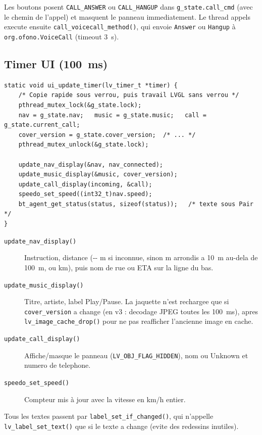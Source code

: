 \documentclass[a4paper,11pt]{article}
\begin{document}
Les boutons posent \texttt{CALL\_ANSWER} ou \texttt{CALL\_HANGUP} dans
\texttt{g\_state.call\_cmd} (avec le chemin de l'appel) et masquent le panneau
immediatement. Le thread appels execute ensuite \texttt{call\_voicecall\_method()},
qui envoie \texttt{Answer} ou
\texttt{Hangup} à \texttt{org.ofono.VoiceCall} (timeout 3~s).

\subsection{Timer UI (100~ms)}

\begin{lstlisting}[style=ccode,caption={main.c --- callback du timer LVGL (v4)}]
static void ui_update_timer(lv_timer_t *timer) {
    /* Copie rapide sous verrou, puis travail LVGL sans verrou */
    pthread_mutex_lock(&g_state.lock);
    nav = g_state.nav;   music = g_state.music;   call = g_state.current_call;
    cover_version = g_state.cover_version;  /* ... */
    pthread_mutex_unlock(&g_state.lock);

    update_nav_display(&nav, nav_connected);
    update_music_display(&music, cover_version);
    update_call_display(incoming, &call);
    speedo_set_speed((int32_t)nav.speed);
    bt_agent_get_status(status, sizeof(status));   /* texte sous Pair */
}
\end{lstlisting}

\begin{description}
  \item[\texttt{update\_nav\_display()}]
    Instruction, distance (\og -{}- m\fg{} si inconnue, sinon m arrondis a 10~m au-dela de
    100~m, ou km), puis nom de rue ou ETA sur la ligne du bas.
  \item[\texttt{update\_music\_display()}]
    Titre, artiste, label Play/Pause. La jaquette n'est rechargee que si
    \texttt{cover\_version} a change (en v3 : decodage JPEG toutes les 100~ms), apres
    \texttt{lv\_image\_cache\_drop()} pour ne pas reafficher l'ancienne image en cache.
  \item[\texttt{update\_call\_display()}]
    Affiche/masque le panneau (\texttt{LV\_OBJ\_FLAG\_HIDDEN}), nom ou
    \og Unknown\fg{} et numero de telephone.
  \item[\texttt{speedo\_set\_speed()}]
    Compteur mis à jour avec la vitesse en km/h entier.
\end{description}

Tous les textes passent par \texttt{label\_set\_if\_changed()}, qui n'appelle
\texttt{lv\_label\_set\_text()} que si le texte a change (evite des redessins inutiles).
\end{document}
